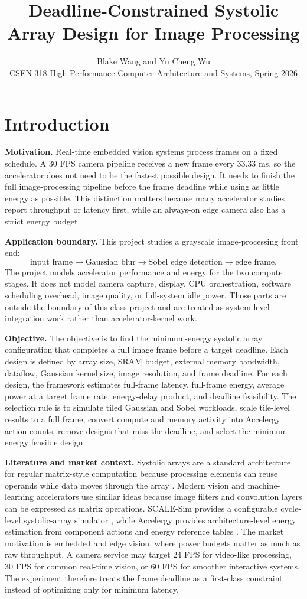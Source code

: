 \documentclass[12pt]{article}
\title{\vspace{-0.5in}Deadline-Constrained Systolic Array Design for Image Processing}
\author{Blake Wang and Yu Cheng Wu\\CSEN 318 High-Performance Computer Architecture and Systems, Spring 2026}
\date{}
\begin{document}
\maketitle

\section{Introduction}

\textbf{Motivation.} Real-time embedded vision systems process frames on a fixed schedule. A 30 FPS camera pipeline receives a new frame every 33.33 ms, so the accelerator does not need to be the fastest possible design. It needs to finish the full image-processing pipeline before the frame deadline while using as little energy as possible. This distinction matters because many accelerator studies report throughput or latency first, while an always-on edge camera also has a strict energy budget.

\textbf{Application boundary.} This project studies a grayscale image-processing front end:
\[
\text{input frame} \rightarrow \text{Gaussian blur} \rightarrow \text{Sobel edge detection} \rightarrow \text{edge frame}.
\]
The project models accelerator performance and energy for the two compute stages. It does not model camera capture, display, CPU orchestration, software scheduling overhead, image quality, or full-system idle power. Those parts are outside the boundary of this class project and are treated as system-level integration work rather than accelerator-kernel work.

\textbf{Objective.} The objective is to find the minimum-energy systolic array configuration that completes a full image frame before a target deadline. Each design is defined by array size, SRAM budget, external memory bandwidth, dataflow, Gaussian kernel size, image resolution, and frame deadline. For each design, the framework estimates full-frame latency, full-frame energy, average power at a target frame rate, energy-delay product, and deadline feasibility. The selection rule is to simulate tiled Gaussian and Sobel workloads, scale tile-level results to a full frame, convert compute and memory activity into Accelergy action counts, remove designs that miss the deadline, and select the minimum-energy feasible design.

\textbf{Literature and market context.} Systolic arrays are a standard architecture for regular matrix-style computation because processing elements can reuse operands while data moves through the array \cite{kung1982}. Modern vision and machine-learning accelerators use similar ideas because image filters and convolution layers can be expressed as matrix operations. SCALE-Sim provides a configurable cycle-level systolic-array simulator \cite{scalesim}, while Accelergy provides architecture-level energy estimation from component actions and energy reference tables \cite{accelergy}. The market motivation is embedded and edge vision, where power budgets matter as much as raw throughput. A camera service may target 24 FPS for video-like processing, 30 FPS for common real-time vision, or 60 FPS for smoother interactive systems. The experiment therefore treats the frame deadline as a first-class constraint instead of optimizing only for minimum latency.
\end{document}
